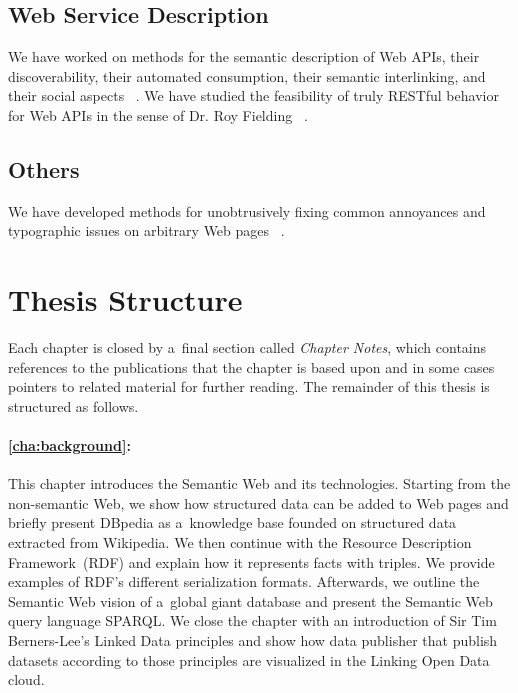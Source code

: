 \subsection{Web Service Description}

We have worked on methods for the semantic description of Web APIs,
their discoverability, their automated consumption,
their semantic interlinking, and their social aspects~%
\cite{verborgh2011descriptionandinteraction,verborgh2011efficientruntime,verborgh2011integratingdata,verborgh2012capturingthefunctionality,verborgh2012functionalcomposition,verborgh2012functionaldescriptions,verborgh2012missinglinks,verborgh2012restdesc,verborgh2012socialdescriptionrevolution,verborgh2013semantic,verborgh2013proof,verborgh2013distributedaffordance}.
We have studied the feasibility of truly RESTful behavior
for Web APIs in the sense of Dr. Roy Fielding~%
\cite{steiner2011fulfilling}.

\subsection{Others}

We have developed methods for unobtrusively fixing
common annoyances and typographic issues
on arbitrary Web pages~%
\cite{steiner2012xkcd37}.

\section{Thesis Structure}

Each chapter is closed by a~final section called
\emph{Chapter Notes}, which contains references to the publications
that the chapter is based upon
and in some cases pointers to related material for further reading.
The remainder of this thesis is structured as follows.

\paragraph{\autoref{cha:background}:}

This chapter introduces the Semantic Web and its technologies.
Starting from the non-semantic Web,
we show how structured data can be added to Web pages
and briefly present DBpedia as a~knowledge base
founded on structured data extracted from Wikipedia.
We then continue with the Resource Description Framework~(RDF)
and explain how it represents facts with triples.
We provide examples of RDF's different serialization formats.
Afterwards, we outline the Semantic Web vision of
a~global giant database and present the Semantic Web
query language SPARQL.
We close the chapter with an introduction of Sir Tim Berners-Lee's
Linked Data principles and show how data publisher that publish
datasets according to those principles are visualized in the
Linking Open Data cloud.

